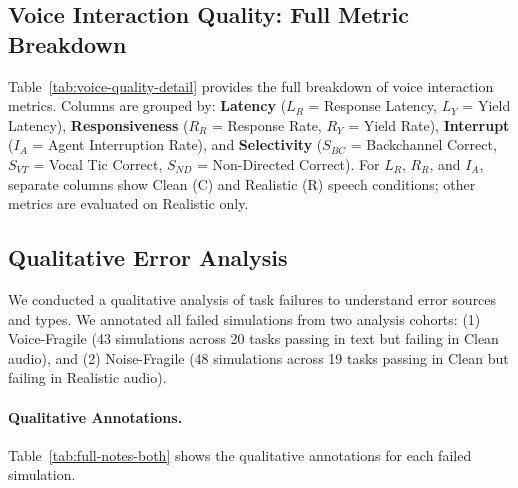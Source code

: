 \subsection{Voice Interaction Quality: Full Metric Breakdown}
\label{app:voice-metrics-detail}

Table~\ref{tab:voice-quality-detail} provides the full breakdown of voice interaction metrics. Columns are grouped by: \textbf{Latency} ($L_R$ = Response Latency, $L_Y$ = Yield Latency), \textbf{Responsiveness} ($R_R$ = Response Rate, $R_Y$ = Yield Rate), \textbf{Interrupt} ($I_A$ = Agent Interruption Rate), and \textbf{Selectivity} ($S_{BC}$ = Backchannel Correct, $S_{VT}$ = Vocal Tic Correct, $S_{ND}$ = Non-Directed Correct). For $L_R$, $R_R$, and $I_A$, separate columns show Clean (C) and Realistic (R) speech conditions; other metrics are evaluated on Realistic only.

\begin{table}[h]
\caption{Voice interaction quality metrics---full breakdown (Realistic condition). \textbf{Bold} indicates best per domain. $\uparrow$ = higher is better, $\downarrow$ = lower is better.}
\label{tab:voice-quality-detail}
\centering
\begin{small}
\resizebox{\textwidth}{!}{%

}
\end{small}
\end{table}



\subsection{Qualitative Error Analysis}
\label{app:qualitative-analysis}

We conducted a qualitative analysis of task failures to understand error sources and types. We annotated all failed simulations from two analysis cohorts: (1) Voice-Fragile (43 simulations across 20 tasks passing in text but failing in Clean audio), and (2) Noise-Fragile (48 simulations across 19 tasks passing in Clean but failing in Realistic audio).

\paragraph{Qualitative Annotations.}
Table~\ref{tab:full-notes-both} shows the qualitative annotations for each failed simulation.

